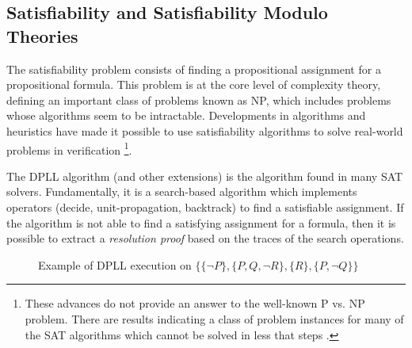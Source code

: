 \subsection{Satisfiability and Satisfiability Modulo Theories}

The satisfiability problem consists of finding a 
propositional assignment for a propositional formula. 
This problem is at the core level of complexity theory, 
defining an important class of problems known as 
NP, which includes problems whose
algorithms seem to be intractable.
Developments in algorithms and heuristics 
\cite{10.5555/2898950, 
935565} have made it possible to use satisfiability 
algorithms 
to solve real-world problems in 
verification \footnote{These
  advances do not provide an answer to the well-known P vs. NP
  problem. There are results indicating a class of problem instances
  for many of the SAT algorithms which cannot be solved in less that
   steps \cite{10.5555/2898950}.
}.

The DPLL algorithm \cite{10.1145/368273.368557} 
(and other extensions) is the algorithm
found in many SAT solvers. Fundamentally, it is a search-based algorithm
which implements operators (decide, unit-propagation, backtrack)
to find a satisfiable assignment. If the algorithm is not able to
find a satisfying assignment for a formula, then it is possible to 
extract a \emph{resolution proof} based on the traces of the search
operations.


  \begin{figure}
    \centering

    \caption{Example of DPLL execution on 
      $\{\{\neg P\}, \{P, Q, \neg R\}, \{R\}, 
    \{P, \neg Q\} \}$} \label{dpll_figure}

  \end{figure}


